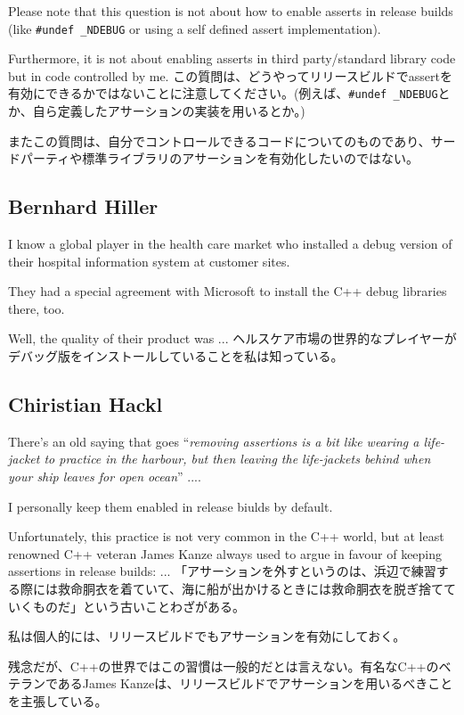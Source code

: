 \documentclass[uplatex,dvipdfmx]{jsarticle} \usepackage{amsmath,amssymb,bm}
\begin{document}
\vspace{\baselineskip}
\begin{paracol}{2}
Please note that this question is not about how to enable asserts in release builds (like {\tt \#undef \_NDEBUG} or using a self defined assert implementation).

Furthermore, it is not about enabling asserts in third party/standard library code but in code controlled by me.
\switchcolumn
この質問は、どうやってリリースビルドでassertを有効にできるかではないことに注意してください。(例えば、{\tt \#undef \_NDEBUG}とか、自ら定義したアサーションの実装を用いるとか。)

またこの質問は、自分でコントロールできるコードについてのものであり、サードパーティや標準ライブラリのアサーションを有効化したいのではない。
\end{paracol}


\subsection*{Bernhard Hiller}
\begin{paracol}{2}
I know a global player in the health care market who installed a debug version of their hospital information system at customer sites.

They had a special agreement with Microsoft to install the C++ debug libraries there, too.

Well, the quality of their product was ...
\switchcolumn
ヘルスケア市場の世界的なプレイヤーがデバッグ版をインストールしていることを私は知っている。
\end{paracol}


\subsection*{Chiristian Hackl}
\begin{paracol}{2}
There's an old saying that goes ``{\it removing assertions is a bit like wearing a life-jacket to practice in the harbour, but then leaving the life-jackets behind when your ship leaves for open ocean}'' ....

I personally keep them enabled in release biulds by default.

Unfortunately, this practice is not very common in the C++ world, but at least renowned C++ veteran James Kanze always used to argue in favour of keeping assertions in release builds: ...
\switchcolumn
「アサーションを外すというのは、浜辺で練習する際には救命胴衣を着ていて、海に船が出かけるときには救命胴衣を脱ぎ捨てていくものだ」という古いことわざがある。

私は個人的には、リリースビルドでもアサーションを有効にしておく。

残念だが、C++の世界ではこの習慣は一般的だとは言えない。有名なC++のベテランであるJames Kanzeは、リリースビルドでアサーションを用いるべきことを主張している。
\end{paracol}
\end{document}

